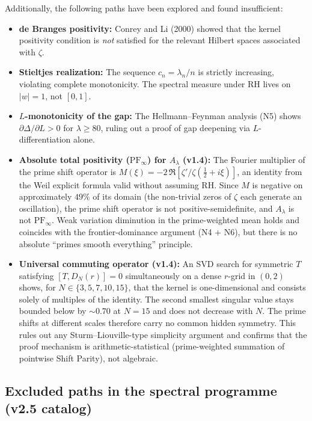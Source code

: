 \documentclass[12pt,a4paper]{article}
\theoremstyle{definition}
\theoremstyle{remark}
\begin{document}
Additionally, the following paths have been explored and found insufficient:
\begin{itemize}
  \item \textbf{de Branges positivity:} Conrey and Li (2000) showed that the kernel positivity condition is \emph{not} satisfied for the relevant Hilbert spaces associated with $\zeta$.
  \item \textbf{Stieltjes realization:} The sequence $c_n = \lambda_n/n$ is strictly increasing, violating complete monotonicity. The spectral measure under RH lives on $|w| = 1$, not $[0,1]$.
  \item \textbf{$L$-monotonicity of the gap:} The Hellmann--Feynman analysis (N5) shows $\partial\Delta/\partial L > 0$ for $\lambda \geq 80$, ruling out a proof of gap deepening via $L$-differentiation alone.
  \item \textbf{Absolute total positivity ($\mathrm{PF}_\infty$) for $A_\lambda$ (v1.4):} The Fourier multiplier of the prime shift operator is $M(\xi) = -2\,\Re[\zeta'/\zeta(\tfrac{1}{2}+i\xi)]$, an identity from the Weil explicit formula valid without assuming RH. Since $M$ is negative on approximately $49\%$ of its domain (the non-trivial zeros of $\zeta$ each generate an oscillation), the prime shift operator is not positive-semidefinite, and $A_\lambda$ is not $\mathrm{PF}_\infty$. Weak variation diminution in the prime-weighted mean holds and coincides with the frontier-dominance argument (N4 + N6), but there is no absolute ``primes smooth everything'' principle.
  \item \textbf{Universal commuting operator (v1.4):} An SVD search for symmetric $T$ satisfying $[T, D_N(r)] = 0$ simultaneously on a dense $r$-grid in $(0,2)$ shows, for $N \in \{3,5,7,10,15\}$, that the kernel is one-dimensional and consists solely of multiples of the identity. The second smallest singular value stays bounded below by $\sim\!0.70$ at $N = 15$ and does not decrease with $N$. The prime shifts at different scales therefore carry no common hidden symmetry. This rules out any Sturm--Liouville-type simplicity argument and confirms that the proof mechanism is arithmetic-statistical (prime-weighted summation of pointwise Shift Parity), not algebraic.
\end{itemize}

\subsection*{Excluded paths in the spectral programme (v2.5 catalog)}
\label{sec:excluded-spectral}
\end{document}
